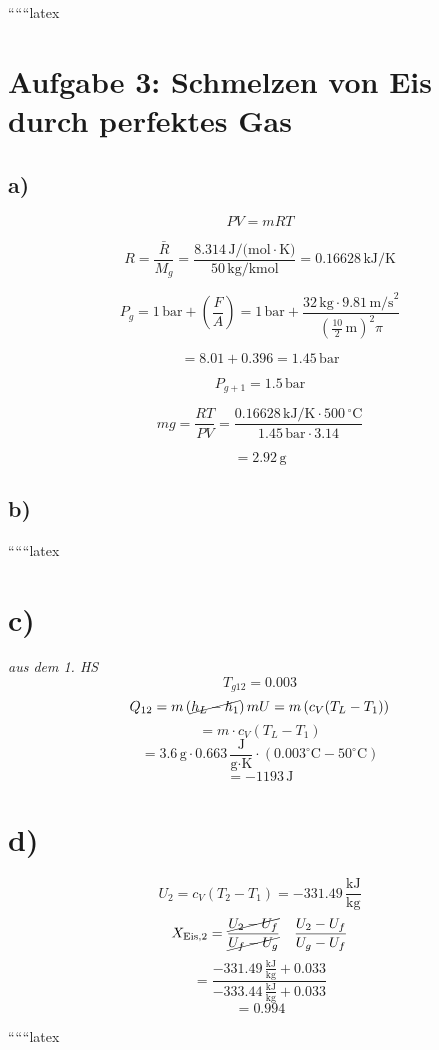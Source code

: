 
``````latex


\section*{Aufgabe 3: Schmelzen von Eis durch perfektes Gas}

\subsection*{a)}

\[
PV = mRT
\]

\[
R = \frac{\bar{R}}{M_g} = \frac{8.314 \, \text{J/(mol} \cdot \text{K)}}{50 \, \text{kg/kmol}} = 0.16628 \, \text{kJ/K}
\]

\[
P_g = 1 \, \text{bar} + \left( \frac{F}{A} \right) = 1 \, \text{bar} + \frac{32 \, \text{kg} \cdot 9.81 \, \text{m/s}^2}{\left( \frac{10}{2} \, \text{m} \right)^2 \pi}
\]

\[
= 8.01 + 0.396 = 1.45 \, \text{bar}
\]

\[
P_{g+1} = 1.5 \, \text{bar}
\]

\[
mg = \frac{RT}{PV} = \frac{0.16628 \, \text{kJ/K} \cdot 500 \, ^\circ\text{C}}{1.45 \, \text{bar} \cdot 3.14}
\]

\[
= 2.92 \, \text{g}
\]

\subsection*{b)}

``````latex

\section*{c)}
\begin{flushleft}
\textit{aus dem 1. HS}
\[
T_{g12} = 0.003
\]
\[
Q_{12} = m \left( \cancel{h_{L} - h_{1}} \right) mU = m \left( c_{V} (T_{L} - T_{1}) \right)
\]
\[
= m \cdot c_{V} (T_{L} - T_{1})
\]
\[
= 3.6 \, \text{g} \cdot 0.663 \, \frac{\text{J}}{\text{g} \cdot \text{K}} \cdot (0.003^\circ \text{C} - 50^\circ \text{C})
\]
\[
= -1193 \, \text{J}
\]
\end{flushleft}

\section*{d)}
\begin{flushleft}
\[
U_{2} = c_{V} (T_{2} - T_{1}) = -331.49 \, \frac{\text{kJ}}{\text{kg}}
\]
\[
X_{\text{Eis}, 2} = \frac{\cancel{U_{2} - U_{f}}}{\cancel{U_{f} - U_{g}}} \quad \frac{U_{2} - U_{f}}{U_{g} - U_{f}}
\]
\[
= \frac{-331.49 \, \frac{\text{kJ}}{\text{kg}} + 0.033}{-333.44 \, \frac{\text{kJ}}{\text{kg}} + 0.033}
\]
\[
= 0.994
\]
\end{flushleft}

``````latex


